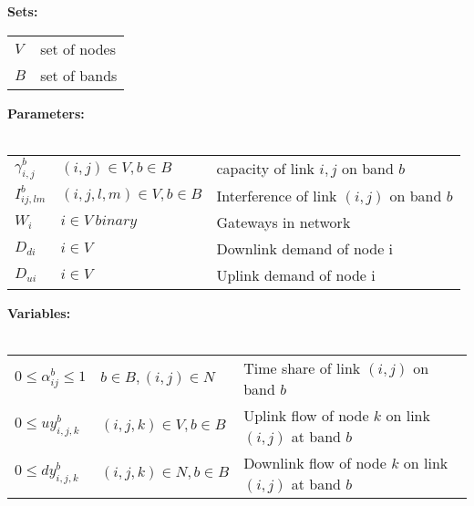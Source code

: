 
\noindent
{\bf Sets:}
\begin{tabular}{ll}
$V$ & set of nodes \\
$B$ & set of bands \\
\end{tabular}

\noindent
{\bf Parameters:}\\
\\
\begin{tabular}{llp{3.4cm}}
$\gamma_{i,j}^b$ & $(i,j)\in V, b \in B$ & capacity of link $i,j$ on band $b$\\
$I_{ij,lm}^b$ & $(i,j,l,m) \in V, b\in B $ & Interference of link $(i,j)$ on band $b$\\
$W_i$ & $i \in V\ binary$ & Gateways in network\\
$D_{di}$ & $i \in V\ $ & Downlink demand of node i\\
$D_{ui}$ & $i \in V\ $ & Uplink demand of node i\\
\end{tabular}


\noindent
{\bf Variables:}\\
\\
\begin{tabular}{llp{3cm}}
$0\le \alpha_{ij}^b \le 1$  & $b\in B, (i,j) \in N$ & 
Time share of link $(i,j)$ on band $b$\\ 
$0\le uy_{i,j,k}^b$ & $(i,j,k) \in V, b \in B$ & 
Uplink flow of node $k$ on link $(i,j)$ at band $b$ \\ 
$0\le dy_{i,j,k}^b$ & $(i,j,k) \in N, b \in B$ & 
Downlink flow of node $k$ on link $(i,j)$ at band $b$ \\ 
\end{tabular}

